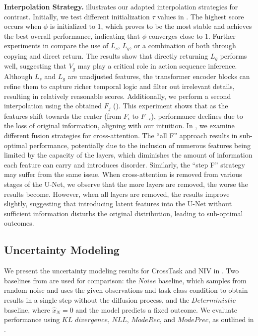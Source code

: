 \textbf{Interpolation Strategy.}  illustrates our adapted interpolation strategies for contrast. 
Initially, we test different initialization $\tau$ values in . The highest score occurs when $\phi$ is initialized to 1, which proves to be the most stable and achieves the best overall performance, indicating that $\phi$ converges close to 1. 
Further experiments in  compare the use of $L_s$, $L_g$, or a combination of both through copying and direct return. The results show that directly returning $L_g$ performs well, suggesting that $V_g$ may play a critical role in action sequence inference. Although $L_s$ and $L_g$ are unadjusted features, the transformer encoder blocks can refine them to capture richer temporal logic and filter out irrelevant details, resulting in relatively reasonable scores. 
Additionally, we perform a second interpolation using the obtained $F_j$ (). This experiment shows that as the features shift towards the center (from $F_i$ to $F_{-i}$), performance declines due to the loss of original information, aligning with our intuition. 
In , we examine different fusion strategies for cross-attention. The ``all F'' approach results in sub-optimal performance, potentially due to the inclusion of numerous features being limited by the capacity of the layers, which diminishes the amount of information each feature can carry and introduces disorder. Similarly, the ``step F'' strategy may suffer from the same issue. When cross-attention is removed from various stages of the U-Net, we observe that the more layers are removed, the worse the results become. However, when all layers are removed, the results improve slightly, suggesting that introducing latent features into the U-Net without sufficient information disturbs the original distribution, leading to sub-optimal outcomes.



\subsection{Uncertainty Modeling} 
We present the uncertainty modeling results for CrossTask and NIV in . Two baselines from \citet{wang2023pdpp} are used for comparison: the $Noise$ baseline, which samples from random noise and uses the given observations and task class condition to obtain results in a single step without the diffusion process, and the $Deterministic$ baseline, where $\hat{x}_N=0$ and the model predicts a fixed outcome. We evaluate performance using $KL$ $divergence$, $NLL$, $ModeRec$, and $ModePrec$, as outlined in \citet{zhao2022p3iv}.

